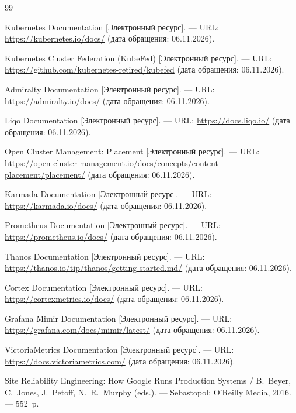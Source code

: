 \begin{thebibliography}{99}

 Kubernetes Documentation [Электронный ресурс]. --- URL:
  \url{https://kubernetes.io/docs/} (дата обращения: 06.11.2026).

 Kubernetes Cluster Federation (KubeFed) [Электронный
  ресурс]. --- URL: \url{https://github.com/kubernetes-retired/kubefed}
  (дата обращения: 06.11.2026).

 Admiralty Documentation [Электронный ресурс]. --- URL:
  \url{https://admiralty.io/docs/} (дата обращения: 06.11.2026).

 Liqo Documentation [Электронный ресурс]. --- URL:
  \url{https://docs.liqo.io/} (дата обращения: 06.11.2026).

 Open Cluster Management: Placement [Электронный ресурс]. ---
  URL: \url{https://open-cluster-management.io/docs/concepts/content-placement/placement/}
  (дата обращения: 06.11.2026).

 Karmada Documentation [Электронный ресурс]. --- URL:
  \url{https://karmada.io/docs/} (дата обращения: 06.11.2026).

 Prometheus Documentation [Электронный ресурс]. ---
  URL: \url{https://prometheus.io/docs/} (дата обращения: 06.11.2026).

 Thanos Documentation [Электронный ресурс]. --- URL:
  \url{https://thanos.io/tip/thanos/getting-started.md/} (дата обращения:
  06.11.2026).

 Cortex Documentation [Электронный ресурс]. --- URL:
  \url{https://cortexmetrics.io/docs/} (дата обращения: 06.11.2026).

 Grafana Mimir Documentation [Электронный ресурс]. --- URL:
  \url{https://grafana.com/docs/mimir/latest/} (дата обращения: 06.11.2026).

 VictoriaMetrics Documentation [Электронный
  ресурс]. --- URL: \url{https://docs.victoriametrics.com/} (дата обращения:
  06.11.2026).

 Site Reliability Engineering: How Google Runs Production
  Systems / B.~Beyer, C.~Jones, J.~Petoff, N.~R.~Murphy (eds.). ---
  Sebastopol: O'Reilly Media, 2016. --- 552~p.


\end{thebibliography}
